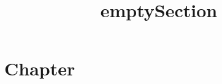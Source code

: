 \documentclass[a4paper,11pt,oneside,openany,report]{jsbook}
\title{emptySection}
\begin{document}
\maketitle
\chapter{Chapter}\label{ch:Chapter}
\section{}\label{sec:Chapter/430001470}
\end{document}
